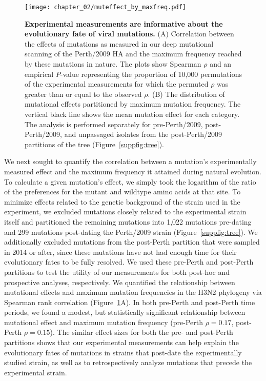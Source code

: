 \begin{figure}
  \centering
  \texttt{[image: chapter\_02/muteffect\_by\_maxfreq.pdf]}
  \caption{\label{fig:muteffect_maxfreq}
    {\bf Experimental measurements are informative about the evolutionary fate of viral mutations.}
    (A) Correlation between the effects of mutations as measured in our deep mutational scanning of the Perth/2009 HA and the maximum frequency reached by these mutations in nature.
    The plots show Spearman $\rho$ and an empirical $P$-value representing the proportion of 10,000 permutations of the experimental measurements for which the permuted $\rho$ was greater than or equal to the observed $\rho$.
    (B) The distribution of mutational effects partitioned by maximum mutation frequency.
    The vertical black line shows the mean mutation effect for each category.
    The analysis is performed separately for pre-Perth/2009, post-Perth/2009, and unpassaged isolates from the post-Perth/2009 partitions of the tree (Figure~\ref{suppfig:tree}).
}
\end{figure}

We next sought to quantify the correlation between a mutation's experimentally measured effect and the maximum frequency it attained during natural evolution.
To calculate a given mutation's effect, we simply took the logarithm of the ratio of the preferences for the mutant and wildtype amino acids at that site.
To minimize effects related to the genetic background of the strain used in the experiment, we excluded mutations closely related to the experimental strain itself and partitioned the remaining mutations into 1,022 mutations pre-dating and 299 mutations post-dating the Perth/2009 strain (Figure~\ref{suppfig:tree}).
We additionally excluded mutations from the post-Perth partition that were sampled in 2014 or after, since these mutations have not had enough time for their evolutionary fates to be fully resolved.
We used these pre-Perth and post-Perth partitions to test the utility of our measurements for both post-hoc and prospective analyses, respectively.
We quantified the relationship between mutational effects and maximum mutation frequencies in the H3N2 phylogeny via Spearman rank correlation (Figure~\ref{fig:muteffect_maxfreq}A).
In both pre-Perth and post-Perth time periods, we found a modest, but statistically significant relationship between mutational effect and maximum mutation frequency (pre-Perth $\rho = 0.17$, post-Perth $\rho = 0.15$).
The similar effect sizes for both the pre- and post-Perth partitions shows that our experimental measurements can help explain the evolutionary fates of mutations in strains that post-date the experimentally studied strain, as well as to retrospectively analyze mutations that precede the experimental strain.

